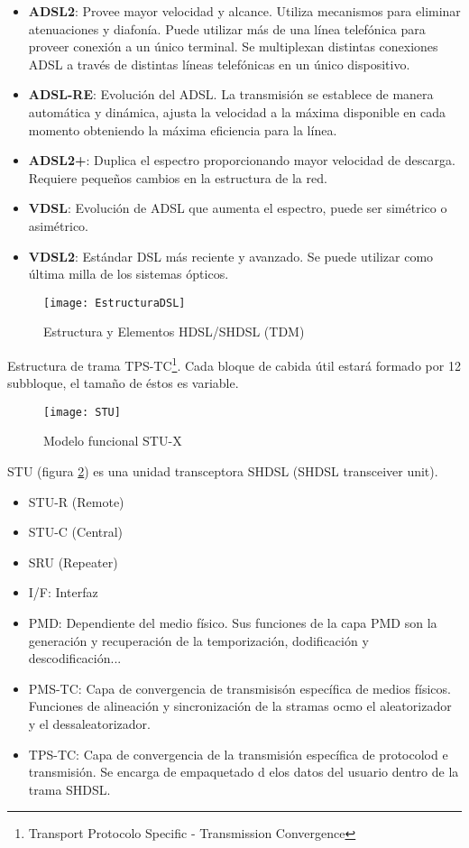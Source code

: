 \documentclass[10pt,portrait, twocolumn]{article}
\begin{document}
\begin{itemize}
		\item \textbf{ADSL2}: Provee mayor velocidad y alcance. Utiliza mecanismos para eliminar atenuaciones y diafonía. Puede utilizar más de una línea telefónica para proveer conexión a un único terminal. Se multiplexan distintas conexiones ADSL a través de distintas líneas telefónicas en un único dispositivo.
		\item \textbf{ADSL-RE}: Evolución del ADSL. La transmisión se establece de manera automática y dinámica, ajusta la velocidad a la máxima disponible en cada momento obteniendo la máxima eficiencia para la línea.
		\item \textbf{ADSL2+}: Duplica el espectro proporcionando mayor velocidad de descarga. Requiere pequeños cambios en la estructura de la red.
		\item \textbf{VDSL}: Evolución de ADSL que aumenta el espectro, puede ser simétrico o asimétrico.
		\item \textbf{VDSL2}: Estándar DSL más reciente y avanzado. Se puede utilizar como última milla de los sistemas ópticos.
	\end{itemize}
	
\begin{figure}[h]
	\centering
    	\texttt{[image: EstructuraDSL]}
	\caption{Estructura y Elementos HDSL/SHDSL  (TDM)}
	\label{fig:ONT}
  \end{figure}
  
Estructura de trama TPS-TC\footnote{Transport Protocolo Specific - Transmission Convergence}. Cada bloque de cabida útil estará formado por 12 subbloque, el tamaño de éstos es variable.

\begin{figure}[h]
	\centering
    	\texttt{[image: STU]}
	\caption{Modelo funcional STU-X}
	\label{fig:STU}
  \end{figure}
  
STU (figura \ref{fig:STU}) es una unidad transceptora SHDSL (SHDSL transceiver unit). 

	\begin{itemize}
		\item STU-R (Remote)
		\item STU-C (Central)
		\item SRU (Repeater)
		\item I/F: Interfaz
		\item PMD: Dependiente del medio físico. Sus funciones de la capa PMD son la generación y recuperación de la temporización, dodificación y descodificación...
		\item PMS-TC: Capa de convergencia de transmisisón específica de medios físicos. Funciones de alineación y sincronización de la stramas ocmo el aleatorizador y el dessaleatorizador.
		\item TPS-TC: Capa de convergencia de la transmisión específica de protocolod e transmisión. Se encarga de empaquetado d elos datos del usuario dentro de la trama SHDSL.
	\end{itemize}  
  
\end{document}
